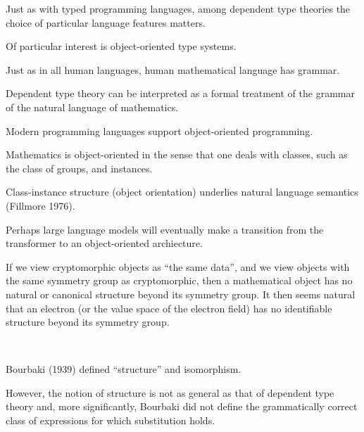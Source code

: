 {\vfill
Just as with typed programming languages, among dependent type theories the choice of particular language features matters.

\vfill
Of particular interest is object-oriented type systems.



Just as in all human languages, human mathematical language has grammar.

\vfill
Dependent type theory can be interpreted as a formal treatment of the grammar of the natural language of mathematics.

Modern programming languages support object-oriented programming.

\vfill
Mathematics is object-oriented in the sense that one deals with classes, such as the class of groups, and instances.

\vfill
Class-instance structure (object orientation) underlies natural language semantics (Fillmore 1976).

\vfill
Perhaps large language models will eventually make a transition from the transformer to an object-oriented archiecture.



If we view cryptomorphic objects as ``the same data'', and we view objects with the same symmetry group as cryptomorphic,
then a mathematical object has no natural or canonical structure beyond its symmetry group.
It then seems natural that an electron (or the value space of the electron field) has no identifiable structure
beyond its symmetry group.




\vspace{-.5in}
~ \hfill\unnamed
    {
    }{
      }
\hfill ~


}




Bourbaki (1939) defined ``structure'' and isomorphism.

\vfill
However, the notion of structure is not as general as that of dependent type theory and,
more significantly, Bourbaki did not define the grammatically correct class of expressions for which substitution holds.


